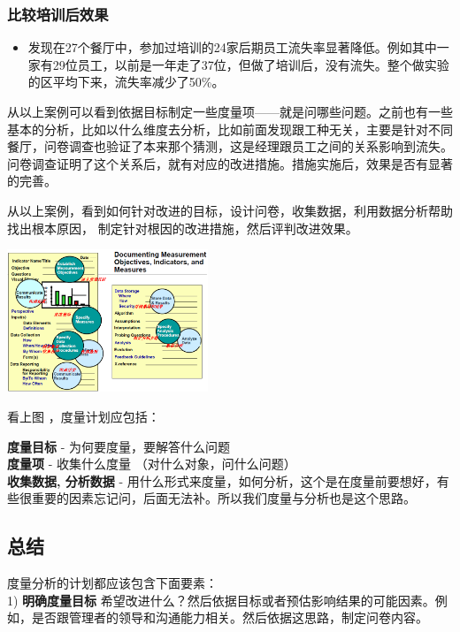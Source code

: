 \hypertarget{ux6bd4ux8f83ux57f9ux8badux540eux6548ux679c}{%
\subsubsection{比较培训后效果}\label{ux6bd4ux8f83ux57f9ux8badux540eux6548ux679c}}

\begin{itemize}
\tightlist
\item
  发现在27个餐厅中，参加过培训的24家后期员工流失率显著降低。例如其中一家有29位员工，以前是一年走了37位，但做了培训后，没有流失。整个做实验的区平均下来，流失率减少了50\%。\\
\end{itemize}

从以上案例可以看到依据目标制定一些度量项------就是问哪些问题。之前也有一些基本的分析，比如以什么维度去分析，比如前面发现跟工种无关，主要是针对不同餐厅，问卷调查也验证了本来那个猜测，这是经理跟员工之间的关系影响到流失。问卷调查证明了这个关系后，就有对应的改进措施。措施实施后，效果是否有显著的完善。

从以上案例，看到如何针对改进的目标，设计问卷，收集数据，利用数据分析帮助找出根本原因，
制定针对根因的改进措施，然后评判改进效果。


\includegraphics[width=6cm]{tys51_10.png}

看上图 ，度量计划应包括：

\textbf{度量目标} - 为何要度量，要解答什么问题\\
\textbf{度量项} - 收集什么度量 （对什么对象，问什么问题）\\
\textbf{收集数据, 分析数据} -
用什么形式来度量，如何分析，这个是在度量前要想好，有些很重要的因素忘记问，后面无法补。所以我们度量与分析也是这个思路。

\hypertarget{ux603bux7ed3}{%
\subsection{总结}\label{ux603bux7ed3}}

度量分析的计划都应该包含下面要素：\\
1) \textbf{明确度量目标}
希望改进什么？然后依据目标或者预估影响结果的可能因素。例如，是否跟管理者的领导和沟通能力相关。然后依据这思路，制定问卷内容。

